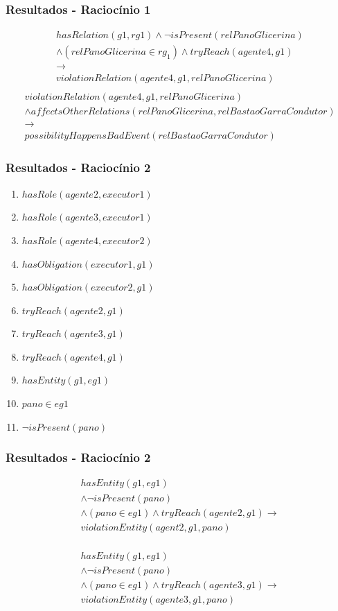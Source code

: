 \documentclass{beamer}
\begin{document}
\begin{frame}
	\frametitle{Resultados - Raciocínio 1}
	\begin{eqnarray}\nonumber
		hasRelation(g1,rg1)\wedge \neg isPresent(relPanoGlicerina)  \nonumber \\ 
		\wedge (relPanoGlicerina\in rg_1) \wedge tryReach(agente4,g1) \nonumber \\ 
		\to \nonumber \\ 
		violationRelation(agente4,g1,relPanoGlicerina) \nonumber \\	
	\end{eqnarray}
	\begin{eqnarray}\nonumber
		violationRelation(agente4,g1,relPanoGlicerina)  \nonumber \\ 
		\wedge affectsOtherRelations(relPanoGlicerina,relBastaoGarraCondutor)   \nonumber \\ 
		\to \nonumber \\  
		possibilityHappensBadEvent(relBastaoGarraCondutor) 
	\end{eqnarray}
\end{frame}
\begin{frame}
	\frametitle{Resultados - Raciocínio 2}
	\begin{enumerate}
		\item $hasRole(agente2,executor1)$ 
		\item $hasRole(agente3,executor1)$	 	
		\item $hasRole(agente4,executor2)$	 
		\item $hasObligation(executor1,g1)$
		\item $hasObligation(executor2,g1)$
		\item $tryReach(agente2,g1)$ 
		\item $tryReach(agente3,g1)$	 	
		\item $tryReach(agente4,g1)$	
		\item $hasEntity(g1,eg1)$		
		\item $pano \in eg1$
		\item $\neg isPresent(pano)$
	\end{enumerate}
\end{frame}
\begin{frame}
	\frametitle{Resultados - Raciocínio 2}
	\begin{eqnarray}\nonumber
		hasEntity(g1,eg1) \nonumber \\ 
		\wedge \neg isPresent(pano) 	\nonumber \\ 
		\wedge (pano \in eg1) \wedge tryReach(agente2,g1) \to \nonumber \\ 
		violationEntity(agent2,g1,pano) \nonumber \\
	\end{eqnarray}

	\begin{eqnarray}\nonumber
		hasEntity(g1,eg1) \nonumber \\ 
		\wedge \neg isPresent(pano) 	\nonumber \\ 
		\wedge (pano \in eg1) \wedge tryReach(agente3,g1) \to \nonumber \\ 
		violationEntity(agente3,g1,pano) \nonumber \\
	\end{eqnarray}

\end{frame}
\end{document}
